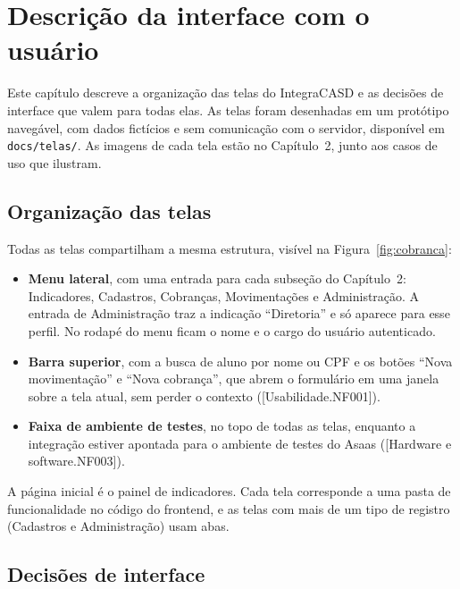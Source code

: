 \documentclass[11pt,a4paper,oneside]{report}
\begin{document}

\chapter{Descrição da interface com o usuário}

Este capítulo descreve a organização das telas do IntegraCASD e as decisões de interface que valem
para todas elas. As telas foram desenhadas em um protótipo navegável, com dados fictícios e sem
comunicação com o servidor, disponível em \texttt{docs/telas/}. As imagens de cada tela estão no
Capítulo~2, junto aos casos de uso que ilustram.

\section{Organização das telas}

Todas as telas compartilham a mesma estrutura, visível na Figura~\ref{fig:cobranca}:
\begin{itemize}
  \item \textbf{Menu lateral}, com uma entrada para cada subseção do Capítulo~2: Indicadores,
        Cadastros, Cobranças, Movimentações e Administração. A entrada de Administração traz a
        indicação ``Diretoria'' e só aparece para esse perfil. No rodapé do menu ficam o nome e o
        cargo do usuário autenticado.
  \item \textbf{Barra superior}, com a busca de aluno por nome ou CPF e os botões ``Nova
        movimentação'' e ``Nova cobrança'', que abrem o formulário em uma janela sobre a tela atual,
        sem perder o contexto ([Usabilidade.NF001]).
  \item \textbf{Faixa de ambiente de testes}, no topo de todas as telas, enquanto a integração
        estiver apontada para o ambiente de testes do Asaas ([Hardware e software.NF003]).
\end{itemize}

A página inicial é o painel de indicadores. Cada tela corresponde a uma pasta de funcionalidade no
código do frontend, e as telas com mais de um tipo de registro (Cadastros e Administração) usam
abas.

\section{Decisões de interface}
\end{document}
